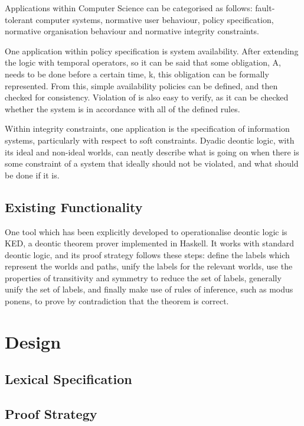 \documentclass{l4proj}
\begin{document}
Applications within Computer Science can be categorised as follows\cite{meyer93applications}: fault-tolerant computer systems, normative user behaviour, policy specification, normative organisation behaviour and normative integrity constraints. %

One application within policy specification is system availability\cite{brunel04deontic}. After extending the logic with temporal operators, so it can be said that some obligation, A, needs to be done before a certain time, k, this obligation can be formally represented. From this, simple availability policies can be defined, and then checked for consistency. Violation of is also easy to verify, as it can be checked whether the system is in accordance with all of the defined rules. 

Within integrity constraints, one application is the specification of information systems\cite{infosystems}, particularly with respect to soft constraints. Dyadic deontic logic, with its ideal and non-ideal worlds, can neatly describe what is going on when there is some constraint of a system that ideally should not be violated, and what should be done if it is. 

\section{Existing Functionality}
One tool which has been explicitly developed to operationalise deontic logic is KED\cite{KED}, a deontic theorem prover implemented in Haskell. It works with standard deontic logic, and its proof strategy follows these steps: define the labels which represent the worlds and paths, unify the labels for the relevant worlds, use the properties of transitivity and symmetry to reduce the set of labels, generally unify 
the set of labels, and finally make use of rules of inference, such as modus ponens, to prove by contradiction that the theorem is correct. 


\chapter{Design}

\section{Lexical Specification}

\section{Proof Strategy}
\end{document}
